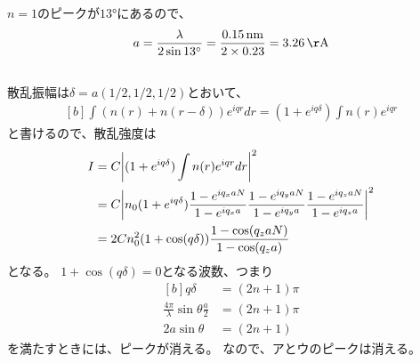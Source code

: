 \documentclass[../../sp_2017.tex]{subfiles}
\begin{document}
\subsection{}
\(n=1\)のピークが\(\ang{13}\)にあるので、
\begin{equation}\begin{aligned}[b]
    a = \frac{\lambda}{2\sin\ang{13}}= \frac{0.15\,\si{nm}}{2\times0.23}=3.26\,\si{\AA}
\end{aligned}\end{equation}

\subsection{}
散乱振幅は\(\delta=a(1/2,1/2,1/2)\)とおいて、
\begin{equation}\begin{aligned}[b]
    \int (n(r)+n(r-\delta))e^{iqr}dr = (1+e^{iq\delta})\int n(r)e^{iqr}
\end{aligned}\end{equation}
と書けるので、散乱強度は
\begin{equation}\begin{aligned}[b]
    I &= C\abs{(1+e^{iq\delta})\int n(r)e^{iqr}dr}^2\\
    &= C\abs{n_0(1+e^{iq\delta})\frac{1-e^{iq_xaN}}{1-e^{iq_xa}}\frac{1-e^{iq_yaN}}{1-e^{iq_ya}}\frac{1-e^{iq_zaN}}{1-e^{iq_za}}}^2\\
    &= 2Cn_0^2(1+\cos(q\delta))\frac{1-\cos(q_zaN)}{1-\cos(q_za)}
\end{aligned}\end{equation}
となる。
\(1+\cos(q\delta)=0\)となる波数、つまり
\begin{equation}\begin{aligned}[b]
    q\delta &= (2n+1)\pi\\
    \frac{4\pi}{\lambda}\sin\theta \frac{a}{2} &= (2n+1)\pi\\
    2a\sin\theta &= (2n+1)
\end{aligned}\end{equation}
を満たすときには、ピークが消える。
なので、アとウのピークは消える。
\end{document}
